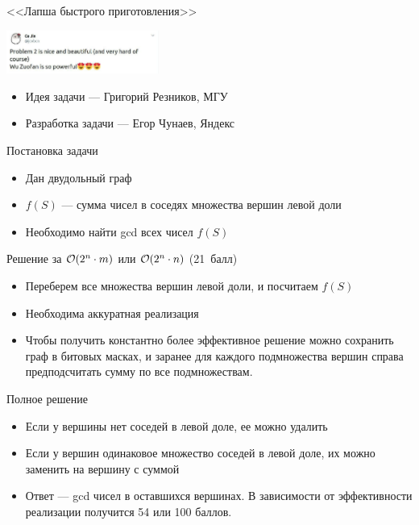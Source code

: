 \begin{frame}
  \begin{center}
    \LARGE <<Лапша быстрого приготовления>>
  \end{center}

  \begin{center}
      \includegraphics[width=5cm]{memes/f-meme.jpg}
  \end{center}

  \begin{itemize}
  \item Идея задачи --- Григорий Резников, МГУ
  \item Разработка задачи --- Егор Чунаев, Яндекс
  \end{itemize}

\end{frame}

\begin{frame}{Постановка задачи}

  \begin{itemize}
  \item Дан двудольный граф
  \item $f(S)$ --- сумма чисел в соседях множества вершин левой доли
  \item Необходимо найти gcd всех чисел $f(S)$
  \end{itemize}
  
\end{frame}

\begin{frame}{Решение за $\mathcal{O}(2^n\cdot m)$ или $\mathcal{O}(2^n \cdot n)$ (21~балл)}
  \begin{itemize}
  \item Переберем все множества вершин левой доли, и посчитаем $f(S)$
  \item Необходима аккуратная реализация
  \item Чтобы получить константно более эффективное решение можно сохранить граф в битовых масках, и заранее
    для каждого подмножества вершин справа предподсчитать сумму по все подмножествам.
  \end{itemize}
\end{frame}

\begin{frame}{Полное решение}
  \begin{itemize}
  \item Если у вершины нет соседей в левой доле, ее можно удалить
  \item Если у вершин одинаковое множество соседей в левой доле, их можно заменить на вершину с суммой
  \item Ответ --- gcd чисел в оставшихся вершинах. В зависимости от эффективности реализации получится 54 или 100 баллов.
  \end{itemize}
\end{frame}

